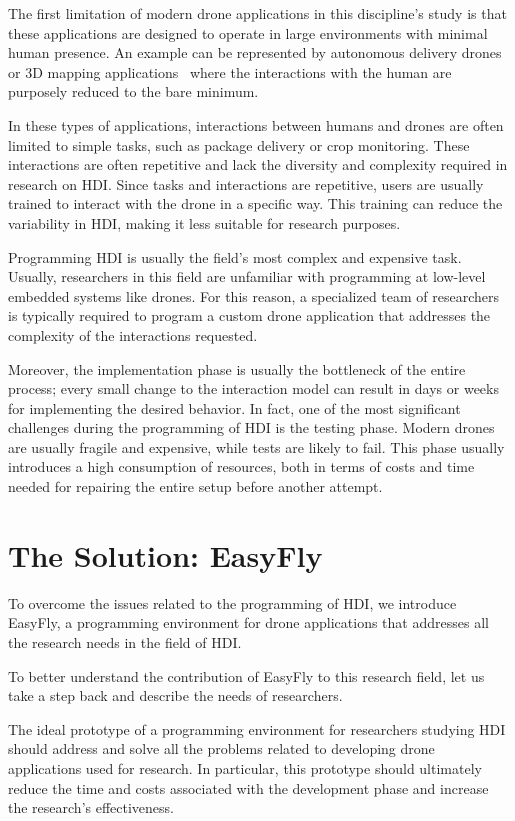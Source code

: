 The first limitation of modern drone applications in this discipline's study is that these applications are designed
to operate in large environments with minimal human presence. An example can be represented by autonomous delivery
drones~\cite{singireddy2018primeAir} or 3D mapping applications~\cite{nex3Dmapping} where the interactions with the human are purposely
reduced to the bare minimum.

In these types of applications, interactions between humans and drones are often limited to simple tasks, such as package
delivery or crop monitoring. These interactions are often repetitive and lack the diversity and complexity required in
research on HDI. Since tasks and interactions are repetitive, users are usually trained to interact with the drone
in a specific way. This training can reduce the variability in HDI, making it less suitable for research purposes.

Programming HDI is usually the field's most complex and expensive task. 
Usually, researchers in this field are unfamiliar with programming at low-level embedded systems like drones.
For this reason, a specialized team of researchers is typically required to program a custom drone application that addresses the complexity of the interactions requested. 

Moreover, the implementation phase is usually the bottleneck of the entire process; every small change to the interaction model can result in days or weeks for implementing the desired behavior.
In fact, one of the most significant challenges during the programming of HDI is the testing phase.
Modern drones are usually fragile and expensive, while tests are likely to fail. 
This phase usually introduces a high consumption of resources, both in terms of costs and time needed for repairing the entire setup before another attempt.


\section{The Solution: EasyFly}\label{sec:the_solution}
To overcome the issues related to the programming of HDI, we introduce EasyFly, a programming environment for drone applications that addresses all the research needs in the field of HDI.

To better understand the contribution of EasyFly to this research field, let us take a step back and describe the needs of researchers.

The ideal prototype of a programming environment for researchers studying HDI should address and solve all the problems related to developing drone applications used for research. 
In particular, this prototype should ultimately reduce the time and costs associated with the development phase and increase the research's effectiveness.

